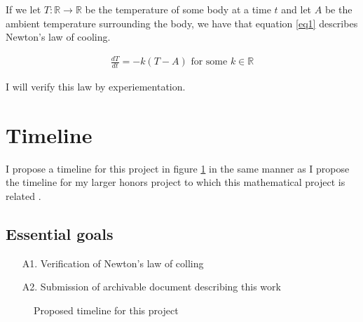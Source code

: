 \documentclass[12pt]{amsart}
\newcommand{\reals}{\mathbb{R}}
\begin{document}
If we let $T: \reals \to \reals$ be the temperature
of some body at a time $t$
and let $A$ be the ambient temperature
surrounding the body,
we have that equation \ref{eq1}
describes Newton's law of cooling.

\begin{align} \label{eq1}
	\frac{dT}{dt} = -k(T - A) \textrm{ for some $k \in \reals$}
\end{align}

I will verify this law by experiementation.

\section{Timeline}

I propose a timeline for this project in figure \ref{timeline}
in the same manner as I propose the timeline for
my larger honors project to which this
mathematical project is related \cite{rpi_plan}.

\subsection{Essential goals}

\begin{enumerate}
	\item[A1.] Verification of Newton's law of colling
	\item[A2.] Submission of archivable document describing this work
\end{enumerate}


\begin{figure}


  \centering
  \caption{Proposed timeline for this project}
  \label{timeline}

\end{figure}



\end{document}
